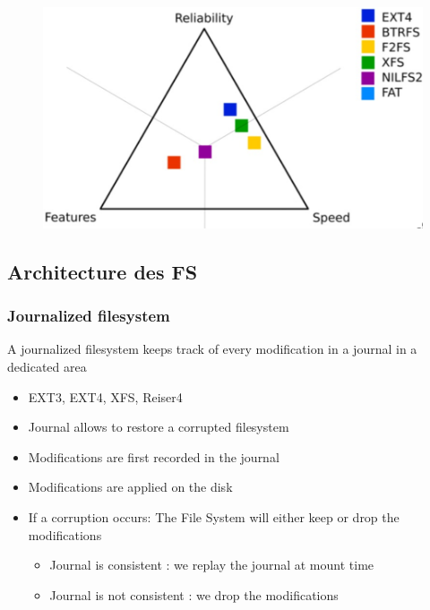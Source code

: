 \documentclass[resume]{subfiles}
\begin{document}
\begin{figure}[H]
    \centering
    \includegraphics[width=0.6\columnwidth]{Figures/fileSystem/fsComp.PNG}
    \label{fig:fsComp}
\end{figure}

\subsection{Architecture des FS}

\subsubsection{Journalized filesystem}
A journalized filesystem keeps track of every modification in a journal in a dedicated area
\begin{itemize}
    \item EXT3, EXT4, XFS, Reiser4
    \item Journal allows to restore a corrupted filesystem
    \item Modifications are first recorded in the journal
    \item Modifications are applied on the disk
    \item If a corruption occurs: The File System will either keep or drop the
    modifications
    \begin{itemize}
        \item Journal is consistent : we replay the journal at mount time
        \item Journal is not consistent : we drop the modifications
    \end{itemize}
\end{itemize}
\end{document}
